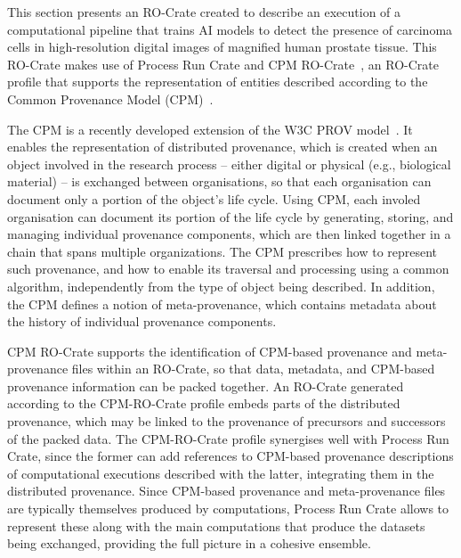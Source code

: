 \documentclass[10pt,letterpaper]{article}
\begin{document}
This section presents an RO-Crate created to describe an execution of a computational pipeline that trains AI models to detect the presence of carcinoma cells in high-resolution digital images of magnified human prostate tissue.
%
This RO-Crate makes use of Process Run Crate and CPM RO-Crate~\cite{cpm-ro-crate}, an RO-Crate profile that supports the representation of entities described according to the Common Provenance Model (CPM)~\cite{Wittner 2022,Wittner 2023b, Wittner 2024}.

The CPM is a recently developed extension of the W3C PROV model~\cite{Moreau 2013}. It enables the representation of distributed provenance,
which is created when an object involved in the research process -- either digital or physical (e.g., biological material) -- is exchanged between organisations, so that each organisation can document only a portion of the object’s life cycle.
Using CPM, each involed organisation can document its portion of the life cycle by generating, storing, and managing individual provenance components, which are then linked together in a chain that spans multiple organizations.
The CPM prescribes how to represent such provenance, and how to enable its traversal and processing using a common algorithm, independently from the type of object being described. In addition, the CPM defines a notion of meta-provenance, which contains metadata about the history of individual provenance components.

CPM RO-Crate supports the identification of CPM-based provenance and meta-provenance files within an RO-Crate, so that data, metadata, and CPM-based provenance information can be packed together.
An RO-Crate generated according to the CPM-RO-Crate profile embeds parts of the distributed provenance, which may be linked to the provenance of precursors and successors of the packed data.
The CPM-RO-Crate profile synergises well with Process Run Crate, since the former can add references to CPM-based provenance descriptions of computational executions described with the latter, integrating them in the distributed provenance. Since CPM-based provenance and meta-provenance files are typically themselves produced by computations, Process Run Crate allows to represent these along with the main computations that produce the datasets being exchanged, providing the full picture in a cohesive ensemble.
\end{document}
